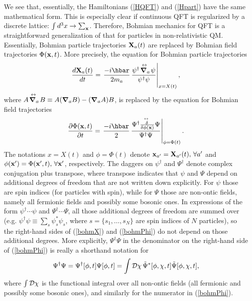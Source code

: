 \documentclass[12pt]{article}
\begin{document}
We see that, essentially, the Hamiltonians (\ref{HQFT}) and (\ref{Hpart})
have the same mathematical form. This is especially clear if 
continuous QFT is regularized by a discrete lattice: $\int d^3x \rightarrow \sum_{\bf x}$. 
Therefore, Bohmian mechanics for QFT is a straightforward generalization of that for particles in 
non-relativistic QM. 
Essentially, Bohmian particle trajectories ${\bf X}_a(t)$ 
are replaced by Bohmian field trajectories $\Phi({\bf x},t)$.
More precisely, the equation for Bohmian particle trajectories   
\begin{equation}\label{bohmX}
\frac{d{\bf X}_a(t)}{dt} =  \left. \frac{-i\hbar}{2m_a} \,
\frac{\psi^{\dagger} \!\stackrel{\leftrightarrow\;}{ \mbox{\boldmath $\nabla$}_a }\!  \psi}
       {\psi^{\dagger}\psi} \right|_{x=X(t)} ,
\end{equation}
where $A \!\stackrel{\leftrightarrow\;}{ \mbox{\boldmath $\nabla$}_a }\! B 
\equiv A (\mbox{\boldmath $\nabla$}_a B) - (\mbox{\boldmath $\nabla$}_a A) B$,
is replaced by the equation for Bohmian field trajectories
\begin{equation}\label{bohmPhi}
 \frac{\partial{\Phi}({\bf x},t)}{\partial t} = \left.  \frac{-i\hbar}{2} \,
\frac{\Psi^{\dagger} {\frac{\!\stackrel{\leftrightarrow\;}{\delta}}{\delta\phi({\bf x})} }  \Psi}
       {\Psi^{\dagger}\Psi} \right|_{\phi=\Phi(t)} .
\end{equation}
The notations $x=X(t)$ and $\phi=\Phi(t)$ denote ${\bf x}_{a'}={\bf X}_{a'}(t),\,\forall a'$ 
and $\phi({\bf x}')=\Phi({\bf x}',t),\, \forall {\bf x}'$, respectively.
The daggers on $\psi^{\dagger}$ and $\Psi^{\dagger}$ denote complex conjugation plus transpose,
where transpose indicates that $\psi$ and $\Psi$ depend on additional degrees of freedom 
that are not written down explicitly. For $\psi$ those are spin indices (for particles with spin),
while for $\Psi$ those are non-ontic fields, namely all fermionic fields and possibly some bosonic ones. 
In expressions of the form $\psi^{\dagger}\cdots\psi$ and $\Psi^{\dagger}\cdots\Psi$,
all those additional degrees of freedom are summed over 
(e.g. $\psi^{\dagger}\psi\equiv \sum_s \psi^*_s\psi_s$, where $s=\{s_1,\ldots,s_N\}$ are spin indices of $N$ particles),
so the right-hand sides of (\ref{bohmX}) and (\ref{bohmPhi}) do not depend on those additional degrees.
%
More explicitly, $\Psi^{\dagger}\Psi$ in the denominator on the right-hand side of (\ref{bohmPhi}) 
is really a shorthand notation for
\begin{equation}\label{fermint}
 \Psi^{\dagger}\Psi = \Psi^{\dagger}[\phi,t]\Psi[\phi,t]=\int{\cal D}\chi \, 
\tilde{\Psi}^*[\phi,\chi,t]\tilde{\Psi}[\phi,\chi,t] ,
\end{equation}
where $\int{\cal D}\chi$ is the functional integral over all non-ontic fields 
(all fermionic and possibly some bosonic ones), and similarly for the numerator in (\ref{bohmPhi}).
\end{document}
